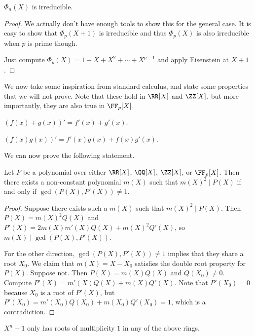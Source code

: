 \documentclass{article}
\begin{document}
\begin{prop}
$\Phi_n(X)$ is irreducible.
\end{prop}

\begin{proof}
We actually don't have enough tools to show this for the general case. It is
easy to show that $\Phi_p(X + 1)$ is irreducible and thus $\Phi_p(X)$ is also
irreducible when $p$ is prime though.

Just compute $\Phi_p(X) = 1 + X + X^2 + \cdots + X^{p - 1}$ and apply Eisenstein
at $X + 1$.
\end{proof}

We now take some inspiration from standard calculus, and state some properties
that we will not prove. Note that these hold in $\RR[X]$ and $\ZZ[X]$, but more
importantly, they are also true in $\FF_p[X]$.

\begin{prop}
$(f(x) + g(x))' = f'(x) + g'(x)$.
\end{prop}

\begin{prop}
$(f(x) g(x))' = f'(x) g(x) + f(x) g'(x)$.
\end{prop}

We can now prove the following statement.

\begin{prop}
Let $P$ be a polynomial over either $\RR[X]$, $\QQ[X]$, $\ZZ[X]$, or $\FF_p[X]$.
Then there exists a non-constant polynomial $m(X)$ such that $m(X)^2 \mid P(X)$
if and only if $\gcd(P(X), P'(X)) \neq 1$.
\end{prop}

\begin{proof}
Suppose there exists such a $m(X)$ such that $m(X)^2 \mid P(X)$. Then $P(X) =
m(X)^2 Q(X)$ and $P'(X) = 2 m(X) m'(X) Q(X) + m(X)^2 Q'(X)$, so $m(X) \mid
\gcd(P(X), P'(X))$.

For the other direction, $\gcd(P(X), P'(X)) \neq 1$ implies that they share a
root $X_0$. We claim that $m(X) = X - X_0$ satisfies the double root property
for $P(X)$. Suppose not. Then $P(X) = m(X) Q(X)$ and $Q(X_0) \neq 0$. Compute
$P'(X) = m'(X) Q(X) + m(X) Q'(X)$. Note that $P'(X_0) = 0$ because $X_0$ is a
root of $P'(X)$, but $P'(X_0) = m'(X_0) Q(X_0) + m(X_0) Q'(X_0) = 1$, which is a
contradiction.
\end{proof}

\begin{cor}
$X^n - 1$ only has roots of multiplicity $1$ in any of the above rings.
\end{cor}
\end{document}
